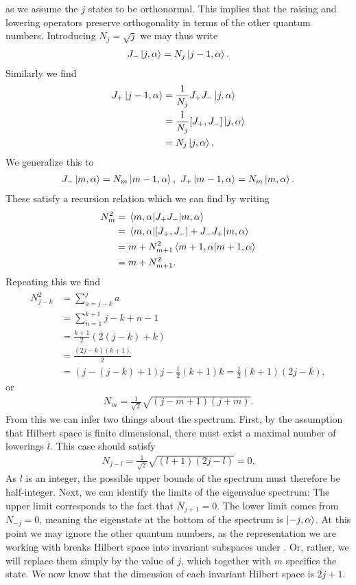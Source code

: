 as we assume the $j$ states to be orthonormal. This implies that the raising and lowering operators preserve orthogonality in terms of the other quantum numbers. Introducing $N_{j} = \sqrt{j}$ we may thus write
\begin{align*}
	J_{-}\ket{j, \alpha} = N_{j}\ket{j - 1, \alpha}.
\end{align*}
Similarly we find
\begin{align*}
	J_{+}\ket{j - 1, \alpha} &= \frac{1}{N_{j}}J_{+}J_{-}\ket{j, \alpha} \\
	                         &= \frac{1}{N_{j}}\comm{J_{+}}{J_{-}}\ket{j, \alpha} \\
	                         &= N_{j}\ket{j, \alpha}.
\end{align*}
We generalize this to
\begin{align*}
	J_{-}\ket{m, \alpha} = N_{m}\ket{m - 1, \alpha},\ J_{+}\ket{m - 1, \alpha} = N_{m}\ket{m, \alpha}.
\end{align*}
These satisfy a recursion relation which we can find by writing
\begin{align*}
	N_{m}^{2} &= \mel{m, \alpha}{J_{+}J_{-}}{m, \alpha} \\
	          &= \mel{m, \alpha}{\comm{J_{+}}{J_{-}} + J_{-}J_{+}}{m, \alpha} \\
	          &= m + N_{m + 1}^{2}\braket{m + 1, \alpha}{m + 1, \alpha} \\
	          &= m + N_{m + 1}^{2}.
\end{align*}
Repeating this we find
\begin{align*}
	N_{j - k}^{2} &= \sum\limits_{a = j - k}^{j}a \\
	              &= \sum\limits_{n = 1}^{k + 1}j - k + n - 1 \\
	              &= \frac{k + 1}{2}(2(j - k) + k) \\
	              &= \frac{(2j - k)(k + 1)}{2} \\
	              &= (j - (j - k) + 1)j - \frac{1}{2}(k + 1)k = \frac{1}{2}(k + 1)(2j - k),
\end{align*}
or
\begin{align*}
	N_{m} = \frac{1}{\sqrt{2}}\sqrt{(j - m + 1)(j + m)}.
\end{align*}
From this we can infer two things about the spectrum. First, by the assumption that Hilbert space is finite dimensional, there must exist a maximal number of lowerings $l$. This case should satisfy
\begin{align*}
	N_{j - l} = \frac{1}{\sqrt{2}}\sqrt{(l + 1)(2j - l)} = 0.
\end{align*}
As $l$ is an integer, the possible upper bounds of the spectrum must therefore be half-integer. Next, we can identify the limits of the eigenvalue spectrum: The upper limit corresponds to the fact that $N_{j + 1} = 0$. The lower limit comes from $N_{-j} = 0$, meaning the eigenstate at the bottom of the spectrum is $\ket{-j, \alpha}$. At this point we may ignore the other quantum numbers, as the representation we are working with breaks Hilbert space into invariant subspaces under . Or, rather, we will replace them simply by the value of $j$, which together with $m$ specifies the state. We now know that the dimension of each invariant Hilbert space is $2j + 1$.

